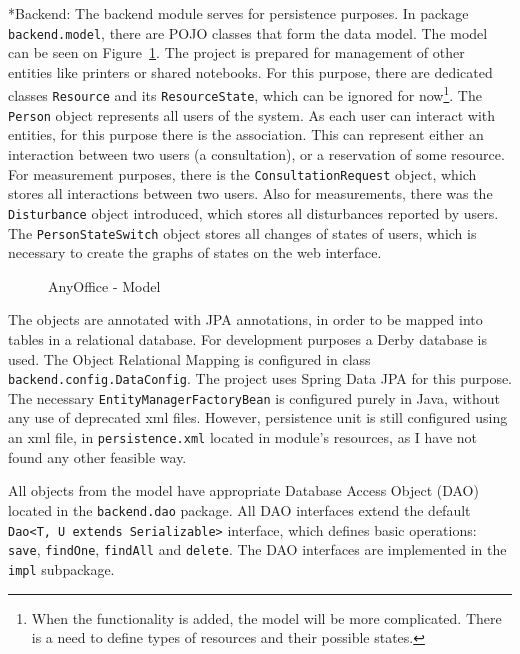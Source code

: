 \documentclass[11pt,singleside]{myfithesis2}
\makeatletter
\newcommand{\pict}[4]{
	\begin{figure}[h!]
  		\vspace{-7px}
  		\centerline{\fcolorbox{darkgray}{palegray}{\texttt{[image: \#2]}}}
  		\caption{#1}
  		\label{#4}
	\end{figure}
}
\renewcommand\paragraph{
   \vspace{-10pt}
   \@startsection{paragraph}{4}{0mm}
      {\baselineskip}
      {- 5pt}
      {\normalfont\normalsize\bfseries}
}
\makeatother
\begin{document}
\paragraph*{Backend: } The backend module serves for persistence purposes. In package \texttt{backend.model}, there are POJO classes that form the data model. The model can be seen on Figure~\ref{pic:anyofficeModel}. The project is prepared for management of other entities like printers or shared notebooks. For this purpose, there are dedicated classes \texttt{Resource} and its \texttt{ResourceState}, which can be ignored for now\footnote{When the functionality is added, the model will be more complicated. There is a need to define types of resources and their possible states.}. The \texttt{Person} object represents all users of the system. As each user can interact with entities, for this purpose there is the association. This can represent either an interaction between two users (a consultation), or a reservation of some resource. For measurement purposes, there is the \texttt{ConsultationRequest} object, which stores all interactions between two users. Also for measurements, there was the \texttt{Disturbance} object introduced, which stores all disturbances reported by users. The \texttt{PersonStateSwitch} object stores all changes of states of users, which is necessary to create the graphs of states on the web interface. 

\pict{AnyOffice - Model}{data/model.png}{width=0.8\textwidth}{pic:anyofficeModel}

The objects are annotated with JPA annotations, in order to be mapped into tables in a relational database. For development purposes a Derby database is used. The Object Relational Mapping is configured in class \texttt{backend.config.DataConfig}. The project uses Spring Data JPA for this purpose. The necessary \texttt{EntityManagerFactoryBean} is configured purely in Java, without any use of deprecated xml files. However, persistence unit is still configured using an xml file, in \texttt{persistence.xml} located in module's resources, as I have not found any other feasible way. 

All objects from the model have appropriate Database Access Object (DAO) located in the \texttt{backend.dao} package. All DAO interfaces extend the default \texttt{Dao<T, U extends Serializable>} interface, which defines basic operations: \texttt{save}, \texttt{findOne}, \texttt{findAll} and \texttt{delete}. The DAO interfaces are implemented in the \texttt{impl} subpackage.
\end{document}
